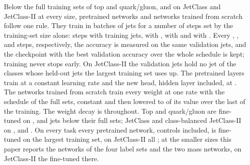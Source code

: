 Below the full training sets of top and quark/gluon, and on JetClass and JetClass-II at every size,
pretrained networks and networks trained from scratch follow one rule. They train in batches of
\FtBudgetBatch{} jets for a number of steps set by the training-set size alone: \FtStepsEThree{} steps with
\FtSizeEThree{} training jets, \FtStepsEFour{} with \FtSizeEFour, \FtStepsEFive{} with \FtSizeEFive{} and
\FtStepsESix{} with \FtSizeESix. Every \FtCheckEThree, \FtCheckEFour, \FtCheckEFive{} and \FtCheckESix{} steps,
respectively, the accuracy is measured on the same \FtValJetsFixed{} validation jets, and the checkpoint with
the best validation accuracy over the whole schedule is kept; training never stops early. On JetClass-II the
validation jets hold no jet of the \FtValAbsentClasses{} classes whose held-out jets the largest training set uses
up. The pretrained layers train at a constant learning rate and the new head, hidden layer included, at
\FtHeadCap. The networks trained from
scratch train every weight at one rate with the schedule of the full sets, constant and then lowered to
\MlstFtHeadDecayTo{} of its value over the last \MlstFtHeadDecayShare{} of the training. The weight decay is \FtBudgetWeightDecay{} throughout. Top and quark/gluon are
fine-tuned on \FtSizeEThree, \FtSizeEFour{} and \FtSizeEFive{} jets below their full sets; JetClass and
class-balanced JetClass-II on \FtSizeEFour, \FtSizeEFive{} and \FtSizeESix. On every task every pretrained network,
controls included, is fine-tuned on the largest training set, on JetClass-II all \FtJcTwoNetsESix{}; at the smaller
sizes this paper reports the networks of the four label sets and the two mass networks, on JetClass-II
the \FtJcTwoNetsSmall{} fine-tuned there.

